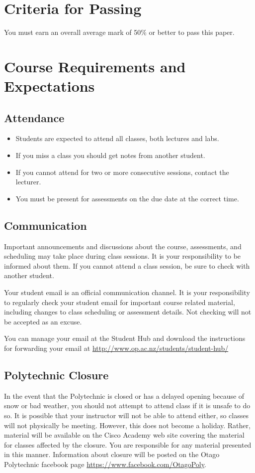 \documentclass{article}
\begin{document}
\section*{Criteria for Passing}
You must earn an overall average mark of 50\% or better to pass this paper.

\section*{Course Requirements and Expectations}
\subsection*{Attendance}
\begin{itemize}
 \item Students are expected to attend all classes, both lectures and labs.
 \item If you miss a class you should get notes from another student.
 \item If you cannot attend for two or more consecutive sessions, contact the lecturer.
 \item You must be present for assessments on the due date at the correct time.
\end{itemize}

\subsection*{Communication}
Important announcements and discussions about the course, assessments, and scheduling may take place during class sessions.  It is your responsibility to be informed about them.  If you cannot attend a class session, be sure to check with another student.

Your student email is an official communication channel. It is your responsibility to regularly check your student email for important course related material, including changes to class scheduling or assessment details. Not checking will not be accepted as an excuse.

You can manage your email at the Student Hub and download the instructions for forwarding your email at \url{http://www.op.ac.nz/students/student-hub/}

\subsection*{Polytechnic Closure}
In the event that the Polytechnic is closed or has a delayed opening because of snow or bad weather, you should not attempt to attend class if it is unsafe to do so. It is possible that your instructor will not be able to attend either, so classes will not physically be meeting. However, this does not become a holiday. Rather, material will be available on the Cisco Academy web site covering the material for classes affected by the closure. You are responsible for any material presented in this manner. Information about closure will be posted on the Otago Polytechnic facebook page \url{https://www.facebook.com/OtagoPoly}.
\end{document}
